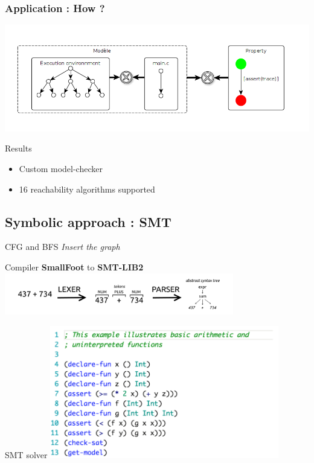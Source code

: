 \documentclass{beamer}
\begin{document}
\begin{frame}
    \frametitle{Application : How ? }

    \includegraphics[width=\textwidth]{Figures/slide_mc.png}

    \begin{block}{Results}
        \begin{itemize}
            \item Custom model-checker
            \item 16 reachability algorithms supported
        \end{itemize}
    \end{block}

\end{frame}





\subsection{Symbolic approach : SMT }
\begin{frame}{CFG and BFS}
    \textit{Insert the graph}
\end{frame}

\begin{frame}{Compiler}
\textbf{SmallFoot} to \textbf{SMT-LIB2}
\includegraphics[width=10cm]{Figures/SMTsolver/Image_PARSER_LEXER.png}

\end{frame}

\begin{frame}{SMT solver}
\includegraphics[width=10cm]{Figures/SMTsolver/SAT_SMTLIB.png}
\end{frame}
\end{document}
